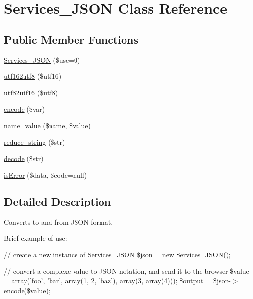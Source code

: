 \hypertarget{class_services___j_s_o_n}{\section{Services\-\_\-\-J\-S\-O\-N Class Reference}
\label{class_services___j_s_o_n}
}
\subsection*{Public Member Functions}
\begin{DoxyCompactItemize}
\item 
\hyperlink{class_services___j_s_o_n_abc84bd855fe129a4c68bcb68b4d17108}{Services\-\_\-\-J\-S\-O\-N} (\$use=0)
\item 
\hyperlink{class_services___j_s_o_n_aa7b1b36cd3a4995bbb60f5def6a216e2}{utf162utf8} (\$utf16)
\item 
\hyperlink{class_services___j_s_o_n_af9687bbf6bcddc9c847d608f9a1fa4c0}{utf82utf16} (\$utf8)
\item 
\hyperlink{class_services___j_s_o_n_acdf1c85111e34b3048d436228bf39819}{encode} (\$var)
\item 
\hyperlink{class_services___j_s_o_n_aa7f3e18209717e584f01f53a0325e9ff}{name\-\_\-value} (\$name, \$value)
\item 
\hyperlink{class_services___j_s_o_n_ae463a3baa44e95fa5b5151ab2334df1c}{reduce\-\_\-string} (\$str)
\item 
\hyperlink{class_services___j_s_o_n_a4afbb486f4a5ff5a8170c832f5997986}{decode} (\$str)
\item 
\hyperlink{class_services___j_s_o_n_a55ae0955466c3970507b122f3f5d1b38}{is\-Error} (\$data, \$code=null)
\end{DoxyCompactItemize}


\subsection{Detailed Description}
Converts to and from J\-S\-O\-N format.

Brief example of use\-:

{\ttfamily  // create a new instance of \hyperlink{class_services___j_s_o_n}{Services\-\_\-\-J\-S\-O\-N} \$json = new \hyperlink{class_services___j_s_o_n_abc84bd855fe129a4c68bcb68b4d17108}{Services\-\_\-\-J\-S\-O\-N()};}

{\ttfamily // convert a complexe value to J\-S\-O\-N notation, and send it to the browser \$value = array('foo', 'bar', array(1, 2, 'baz'), array(3, array(4))); \$output = \$json-\/$>$encode(\$value);}

